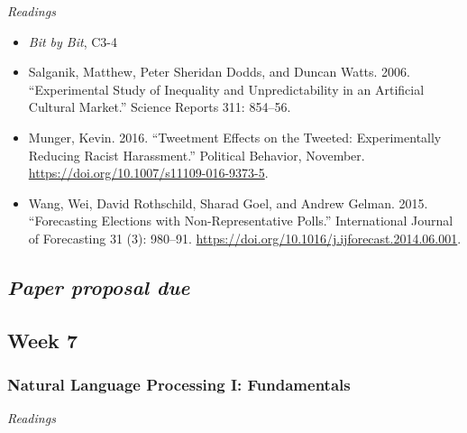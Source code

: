 \documentclass[
  10pt,
]{article}
\providecommand{\tightlist}{%
  \setlength{\itemsep}{0pt}\setlength{\parskip}{0pt}}
\begin{document}
\emph{Readings}

\begin{itemize}
\tightlist
\item
  \emph{Bit by Bit}, C3-4
\item
  Salganik, Matthew, Peter Sheridan Dodds, and Duncan Watts. 2006.
  ``Experimental Study of Inequality and Unpredictability in an
  Artificial Cultural Market.'' Science Reports 311: 854--56.
\item
  Munger, Kevin. 2016. ``Tweetment Effects on the Tweeted:
  Experimentally Reducing Racist Harassment.'' Political Behavior,
  November. \url{https://doi.org/10.1007/s11109-016-9373-5}.
\item
  Wang, Wei, David Rothschild, Sharad Goel, and Andrew Gelman. 2015.
  ``Forecasting Elections with Non-Representative Polls.'' International
  Journal of Forecasting 31 (3): 980--91.
  \url{https://doi.org/10.1016/j.ijforecast.2014.06.001}.
\end{itemize}

\hypertarget{paper-proposal-due}{%
\subsection{\texorpdfstring{\emph{Paper proposal
due}}{Paper proposal due}}\label{paper-proposal-due}}

\hypertarget{week-7}{%
\subsection{Week 7}\label{week-7}}

\hypertarget{natural-language-processing-i-fundamentals}{%
\subsubsection{Natural Language Processing I:
Fundamentals}\label{natural-language-processing-i-fundamentals}}

\emph{Readings}
\end{document}

